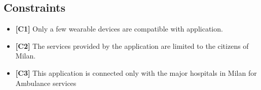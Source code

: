 \subsection{Constraints}
\begin{itemize}
\item{\textbf{[C1]}} Only a few wearable devices are compatible with application.
\item{\textbf{[C2]}} The services provided by the application are limited to the citizens of Milan.
\item{\textbf{[C3]}} This application is connected only with the major hospitals in Milan for Ambulance services
\end{itemize}